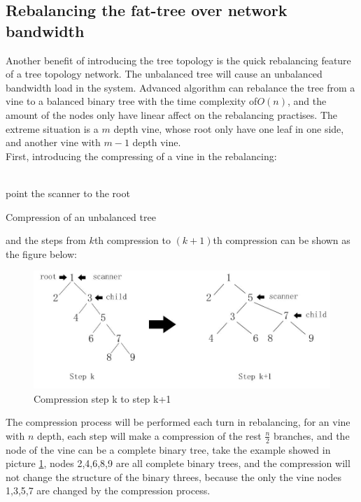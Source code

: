 \documentclass[11pt,openright,a4paper]{report}
\begin{document}
\subsection{Rebalancing the fat-tree over network bandwidth}
Another benefit of introducing the tree topology is the quick rebalancing feature of a tree topology network. The unbalanced tree will cause an unbalanced bandwidth load in the system. Advanced algorithm can rebalance the tree from a vine to a balanced binary tree with the time complexity of$O(n)$, and the amount of the nodes only have linear affect on the rebalancing practises. The extreme situation is a $m$ depth vine, whose root only have one leaf in one side, and another vine with $m-1$ depth vine.\\  
First, introducing the compressing of a vine in the rebalancing:\\
\\
\begin{algorithm}[H]
	point the scanner to the root\;
	\caption{Compression of an unbalanced tree}
\end{algorithm}
and the steps from $k$th compression to $(k+1)$th compression can be shown as the figure below:
\begin{figure}[H]
	\centering
    \includegraphics[width=0.6\linewidth]{picture/compression.JPG}
    \caption{Compression step k to step k+1}
    \label{fig:compression}
\end{figure}
The compression process will be performed each turn in rebalancing, for an vine with $n$ depth, each step will make a compression of the rest $\frac{n}{2}$ branches, and the node of the vine can be a complete binary tree, take the example showed in picture \ref{fig:compression}, nodes 2,4,6,8,9 are all complete binary trees, and the compression will not change the structure of the binary threes, because the only the vine nodes 1,3,5,7 are changed by the compression process\cite{stout1986tree}.\\
\end{document}
